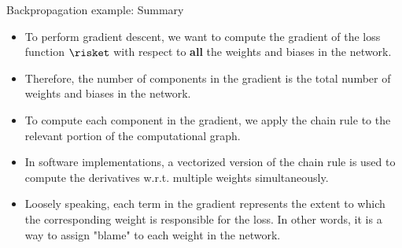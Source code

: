 \begin{frame} {Backpropagation example: Summary}
  \begin{itemize}
      \item To perform gradient descent, we want to compute the gradient of the loss function $\risket$ with respect to \textbf{all} the weights and biases in the network.
      \item Therefore, the number of components in the gradient is the total number of weights and biases in the network.
      \item To compute each component in the gradient, we apply the chain rule to the relevant portion of the computational graph.
      \item In software implementations, a vectorized version of the chain rule is used to compute the derivatives w.r.t. multiple weights simultaneously.
      \item Loosely speaking, each term in the gradient represents the extent to which the corresponding weight is responsible for the loss. In other words, it is a way to assign "blame" to each weight in the network.
  \end{itemize}
\end{frame}

